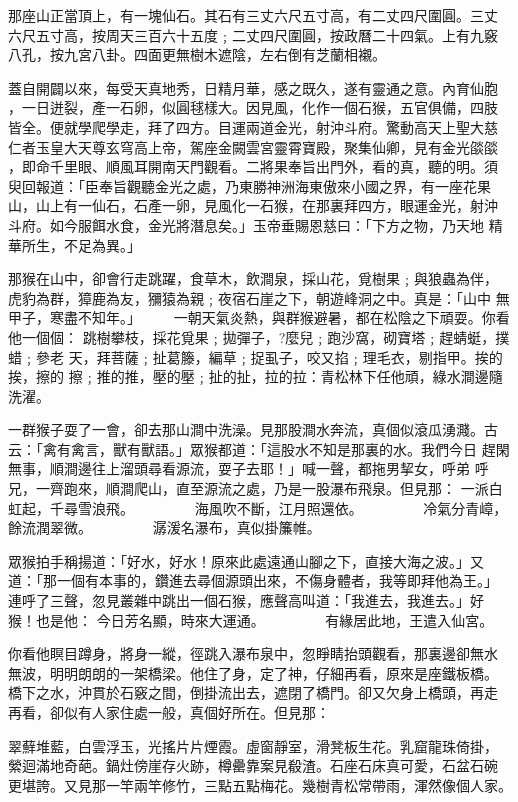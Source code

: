 \begin{pinyinscope}
{那座山正當頂上，有一塊仙石。其石有三丈六尺五寸高，有二丈四尺圍圓。三丈
六尺五寸高，按周天三百六十五度﹔二丈四尺圍圓，按政曆二十四氣。上有九竅
八孔，按九宮八卦。四面更無樹木遮陰，左右倒有芝蘭相襯。

蓋自開闢以來，每受天真地秀，日精月華，感之既久，遂有靈通之意。內育仙胞
，一日迸裂，產一石卵，似圓毬樣大。因見風，化作一個石猴，五官俱備，四肢
皆全。便就學爬學走，拜了四方。目運兩道金光，射沖斗府。驚動高天上聖大慈
仁者玉皇大天尊玄穹高上帝，駕座金闕雲宮靈霄寶殿，聚集仙卿，見有金光燄燄
，即命千里眼、順風耳開南天門觀看。二將果奉旨出門外，看的真，聽的明。須
臾回報道：「臣奉旨觀聽金光之處，乃東勝神洲海東傲來小國之界，有一座花果
山，山上有一仙石，石產一卵，見風化一石猴，在那裏拜四方，眼運金光，射沖
斗府。如今服餌水食，金光將潛息矣。」玉帝垂賜恩慈曰：「下方之物，乃天地
精華所生，不足為異。」

那猴在山中，卻會行走跳躍，食草木，飲澗泉，採山花，覓樹果﹔與狼蟲為伴，
虎豹為群，獐鹿為友，獼猿為親﹔夜宿石崖之下，朝遊峰洞之中。真是：「山中
無甲子，寒盡不知年。」
　　一朝天氣炎熱，與群猴避暑，都在松陰之下頑耍。你看他一個個：
跳樹攀枝，採花覓果﹔拋彈子，?麼兒﹔跑沙窩，砌寶塔﹔趕蜻蜓，撲蜡﹔參老
天，拜菩薩﹔扯葛籐，編草﹔捉虱子，咬又掐﹔理毛衣，剔指甲。挨的挨，擦的
擦﹔推的推，壓的壓﹔扯的扯，拉的拉：青松林下任他頑，綠水澗邊隨洗濯。

一群猴子耍了一會，卻去那山澗中洗澡。見那股澗水奔流，真個似滾瓜湧濺。古
云：「禽有禽言，獸有獸語。」眾猴都道：「這股水不知是那裏的水。我們今日
趕閑無事，順澗邊往上溜頭尋看源流，耍子去耶！」喊一聲，都拖男挈女，呼弟
呼兄，一齊跑來，順澗爬山，直至源流之處，乃是一股瀑布飛泉。但見那：
一派白虹起，千尋雪浪飛。
　　　　海風吹不斷，江月照還依。
　　　　冷氣分青嶂，餘流潤翠微。
　　　　潺湲名瀑布，真似掛簾帷。

眾猴拍手稱揚道：「好水，好水！原來此處遠通山腳之下，直接大海之波。」又
道：「那一個有本事的，鑽進去尋個源頭出來，不傷身體者，我等即拜他為王。」
連呼了三聲，忽見叢雜中跳出一個石猴，應聲高叫道：「我進去，我進去。」好
猴！也是他：
        今日芳名顯，時來大運通。
　　　　有緣居此地，王遣入仙宮。

你看他瞑目蹲身，將身一縱，徑跳入瀑布泉中，忽睜睛抬頭觀看，那裏邊卻無水
無波，明明朗朗的一架橋梁。他住了身，定了神，仔細再看，原來是座鐵板橋。
橋下之水，沖貫於石竅之間，倒掛流出去，遮閉了橋門。卻又欠身上橋頭，再走
再看，卻似有人家住處一般，真個好所在。但見那：

翠蘚堆藍，白雲浮玉，光搖片片煙霞。虛窗靜室，滑凳板生花。乳窟龍珠倚掛，
縈迴滿地奇葩。鍋灶傍崖存火跡，樽罍靠案見殽渣。石座石床真可愛，石盆石碗
更堪誇。又見那一竿兩竿修竹，三點五點梅花。幾樹青松常帶雨，渾然像個人家。

}
\end{pinyinscope}
